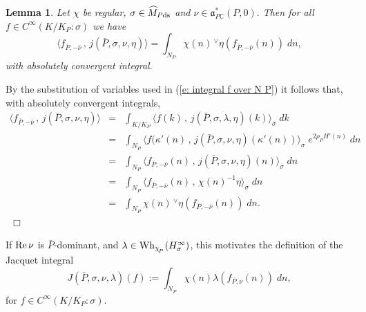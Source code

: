 \documentclass[12pt,a4paper]{article}
\newtheorem{Lemma}[Thm]{Lemma}
\newenvironment{lemma}[0]{\begin{Lemma}\noindent}%
{\end{Lemma}}
\def\proof{\par\noindent{\it Proof.}{\ }{\ }}
\def\qed{~\hfill\hbox{$\Box$}\medbreak}
\def\msy#1{{\mathbb #1}}
\def\C{{\msy C}}
\def\gl{\lambda}
\def\gs{\sigma}
\def\got#1{\mathfrak #1}
\def\fa{{\got a}}
\def\Re{{\rm Re}\,}
\def\inp#1#2{\langle#1\,,\,#2\rangle}
\def\iC{{\scriptscriptstyle \C}}
\numberwithin{Thm}{section}
\numberwithin{equation}{section}
\def\Wh{{\rm Wh}}
\def\faPdc{{\fa_{P\iC}^*}}
\numberwithin{equation}{section}
\def\faPdc{\fa_{P\iC}^*}
\def\cchiP{\cchi_{{\!}_P} }
\def\cchi{\chi}
\def\veec{\vee}%
\def\trw{{}^{\scriptscriptstyle\veec}}
\begin{document}
\begin{lemma}
\label{l: intro Jacquet}
Let $\cchi$ be regular, $\gs \in \widehat M_{P{\rm ds}}$ and $\nu \in \faPdc(P,0).$ Then for all $f \in C^\infty(K/K_P: \gs)$
we have
$$ 
\inp{f_{\bar P, -\bar\nu}} {j(\bar P, \gs, \nu, \eta)} 
=
\int_{N_P} \cchi(n)\,  \trw\! \eta (f_{\bar P, -\bar \nu}(n)) \; dn,
$$%
with absolutely convergent integral.
\end{lemma}

\proof 
By the substitution of variables used in (\ref{e: integral f over N P}) it follows 
that, with absolutely convergent integrals, 
%
\begin{eqnarray*}
\inp{f_{\bar P, -\bar\nu}} {j(\bar P, \gs, \nu, \eta)} & = &  \int_{K/K_P} \inp{f(k)}{j(\bar P, \gs, \gl, \eta)(k)}_\gs\; dk\\
&=& 
\int_{N_P} \inp{f(\kappa'(n)} {j(\bar P, \gs, \nu, \eta)(\kappa'(n))}_\gs \;e^{2\rho_P H'(n)} \; dn\\
&=& 
\int_{N_P} \inp{f_{\bar P, - \bar \nu}(n )}{j(\bar P, \gs, \nu, \eta)(n)}_\gs\; dn\\
&=&
\int_{N_P} \inp{f_{\bar P, - \bar \nu}(n )}{\cchi(n)^{-1}\eta}_\gs\; dn\\
&=& 
\int_{N_P}  \cchi(n)\, \trw\! \eta( f_{\bar P, -\bar \nu}(n)) \; dn.
\end{eqnarray*}
\qed

If $\Re \nu$ is $\bar P$-dominant, and $\gl \in \Wh_{\cchiP}(H_\gs^\infty)$, 
% 
this motivates the definition of the Jacquet integral 
\begin{equation}
\label{e: Jacquet integral}
J(\bar P, \gs, \nu, \gl )(f) := \int_{N_P} \cchi(n) \gl(f_{\bar P, \nu}(n)) \;  dn,
\end{equation} 
for $f \in C^\infty(K/K_P:\gs).$  
\end{document}
